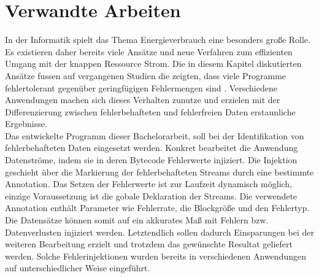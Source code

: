 \chapter{Verwandte Arbeiten}\vspace{1cm}
In der Informatik spielt das Thema Energieverbrauch eine besonders gro\ss e Rolle. Es existieren daher bereits viele Ans\"atze und neue Verfahren zum effizienten Umgang mit der knappen Ressource Strom. Die in diesem Kapitel diskutierten Ans\"atze fussen auf vergangenen Studien die zeigten, dass viele Programme fehlertolerant gegen\"uber geringf\"ugigen Fehlermengen sind \cite{correctness}. Verschiedene Anwendungen machen sich dieses Verhalten zunutze und erzielen mit der Differenzierung zwischen fehlerbehafteten und fehlerfreien Daten erstaunliche Ergebnisse.\\ 
Das entwickelte Programm dieser Bachelorarbeit, soll bei der Identifikation von fehlerbehafteten Daten eingesetzt werden. Konkret bearbeitet die Anwendung Datenströme, indem sie in deren Bytecode Fehlerwerte injiziert. Die Injektion geschieht \"uber die Markierung der fehlerbehafteten Streams durch eine bestimmte Annotation. Das Setzen der Fehlerwerte ist zur Laufzeit dynamisch m\"oglich, einzige Voraussetzung ist die gobale Deklaration der Streams. Die verwendete Annotation enth\"alt Parameter wie Fehlerrate, die Blockgr\"o\ss e und den Fehlertyp. Die Datensätze können somit auf ein akkurates Ma\ss {} mit Fehlern bzw. Datenverlusten injiziert werden. Letztendlich sollen dadurch Einsparungen bei der weiteren Bearbeitung erzielt und trotzdem das gew\"unschte Resultat geliefert werden. Solche Fehlerinjektionen wurden bereits in verschiedenen Anwendungen auf unterschiedlicher Weise eingef\"uhrt. 


